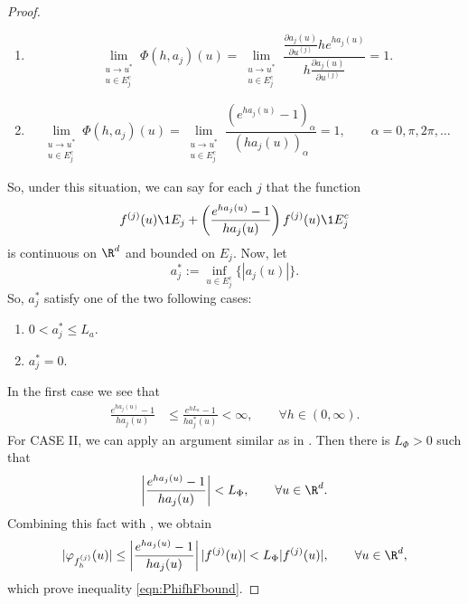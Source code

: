\begin{proof}
	\begin{enumerate}[C{A}SE I:]
		\item
			\begin{equation}\label{eqn:ajSingularityCasei}
				\lim_{
					\substack{
						u \to u^*\\ 
						u\in E_j^c
					}
				}
				\Phi(h,a_j)(u) =
				\lim_{
					\substack{
						u \to u^*\\ 
						u\in E_j^c
					}
				}	
				\frac{\frac{\partial a_j(u)}{\partial u^{(j)}} 
					h e^{h a_j(u)} 
				}{
					h\frac{\partial a_j(u)}{\partial u^{(j)}}
				}=1.
			\end{equation}	
		\item
			\begin{equation}\label{eqn:ajSingularityCaseii}
			\lim_{
				\substack{
					u \to u^*\\ 
					u\in E_j^c
				}
			}
			\Phi(h,a_j)(u) 
			=
			\lim_{
				\substack{
					u \to u^*\\ 
					u\in E_j^c
				}
			}	
			\frac{
				\left(
					 e^{h a_j(u)} - 1
				 \right)_{\alpha}
			}{
				\left(
					h a_j(u)
				\right)_{\alpha}
			}	=	1, \qquad \alpha = 0,\pi, 2\pi,\dots
		\end{equation}	
	\end{enumerate}
	So, under this situation, we can say for each $j$ that the function
	\begin{equation*}
		f^{(j)}(u) \1{E_j} +
		\left(
			\frac{e^{ha_j(u)}-1}{ha_j(u)}
		\right)
		f^{(j)}(u) \1{E_j^c}
	\end{equation*}
	is continuous on $\R^d$ and bounded on $E_j$.
	Now, let
		$$
			a^*_j:= \inf_{u\in E_j^c}
			\{
				|a_j(u)|
			\}.
		$$
	So, $a^*_j$ satisfy one of the two following cases:
	\begin{enumerate}[C{A}SE a:]
		\item
			$
				\displaystyle
				0 < a_j^*\leq L_a. 
			$
		\item
			$a_j^*=0$.
	\end{enumerate}
	In the first case we see that
	\begin{align*}
		\frac{e^{h a_j(u)}-1}{ha_j(u)}
		& \leq
			\frac{e^{h L_a}-1}{ha^*_j(u)} <\infty,
		\qquad \forall h\in (0,\infty ).
	\end{align*}
	For CASE II, we can apply an argument similar as in .
	Then there is  $L_{\Phi}>0$ such that
	\begin{equation}\label{eqn:PhiBound}
		\left|
			\frac{e^{ha_j(u)}-1}{ha_j(u)}
		\right| < L_{\Phi},
		\qquad \forall u \in \R^d.
	\end{equation}	
%		
	Combining this fact with , we obtain
	$$
		|\varphi_{f_h^{(j)}}(u)|
		\leq
		\left|
			\frac{e^{ha_j(u)}-1}{ha_j(u)}
		\right||f^{(j)}(u)| < L_{\Phi} |f^{(j)}(u)|,
		\qquad \forall u \in \R^d,
	$$
	which prove inequality \eqref{eqn:PhifhFbound}.
	

\end{proof}
